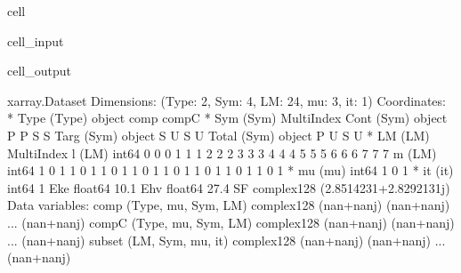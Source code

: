 \documentclass[letterpaper,table,10pt,english]{jupyterBook}
\begin{document}
\begin{sphinxuseclass}{cell}\begin{sphinxVerbatimInput}

\begin{sphinxuseclass}{cell_input}
\begin{sphinxVerbatim}[commandchars=\\\{\}]
\PYG{p}{[}\PYG{p}{]}\PYG{p}{[}\PYG{p}{]}
\end{sphinxVerbatim}

\end{sphinxuseclass}\end{sphinxVerbatimInput}
\begin{sphinxVerbatimOutput}

\begin{sphinxuseclass}{cell_output}
\begin{sphinxVerbatim}[commandchars=\\\{\}]
\PYGZlt{}xarray.Dataset\PYGZgt{}
Dimensions:  (Type: 2, Sym: 4, LM: 24, mu: 3, it: 1)
Coordinates:
  * Type     (Type) object \PYGZsq{}comp\PYGZsq{} \PYGZsq{}compC\PYGZsq{}
  * Sym      (Sym) MultiIndex
  \PYGZhy{} Cont     (Sym) object \PYGZsq{}P\PYGZsq{} \PYGZsq{}P\PYGZsq{} \PYGZsq{}S\PYGZsq{} \PYGZsq{}S\PYGZsq{}
  \PYGZhy{} Targ     (Sym) object \PYGZsq{}S\PYGZsq{} \PYGZsq{}U\PYGZsq{} \PYGZsq{}S\PYGZsq{} \PYGZsq{}U\PYGZsq{}
  \PYGZhy{} Total    (Sym) object \PYGZsq{}P\PYGZsq{} \PYGZsq{}U\PYGZsq{} \PYGZsq{}S\PYGZsq{} \PYGZsq{}U\PYGZsq{}
  * LM       (LM) MultiIndex
  \PYGZhy{} l        (LM) int64 0 0 0 1 1 1 2 2 2 3 3 3 4 4 4 5 5 5 6 6 6 7 7 7
  \PYGZhy{} m        (LM) int64 \PYGZhy{}1 0 1 \PYGZhy{}1 0 1 \PYGZhy{}1 0 1 \PYGZhy{}1 0 1 \PYGZhy{}1 0 1 \PYGZhy{}1 0 1 \PYGZhy{}1 0 1 \PYGZhy{}1 0 1
  * mu       (mu) int64 \PYGZhy{}1 0 1
  * it       (it) int64 1
    Eke      float64 10.1
    Ehv      float64 27.4
    SF       complex128 (2.8514231+2.8292131j)
Data variables:
    comp     (Type, mu, Sym, LM) complex128 (nan+nanj) (nan+nanj) ... (nan+nanj)
    compC    (Type, mu, Sym, LM) complex128 (nan+nanj) (nan+nanj) ... (nan+nanj)
    subset   (LM, Sym, mu, it) complex128 (nan+nanj) (nan+nanj) ... (nan+nanj)
\end{sphinxVerbatim}

\end{sphinxuseclass}\end{sphinxVerbatimOutput}

\end{sphinxuseclass}
\end{document}
